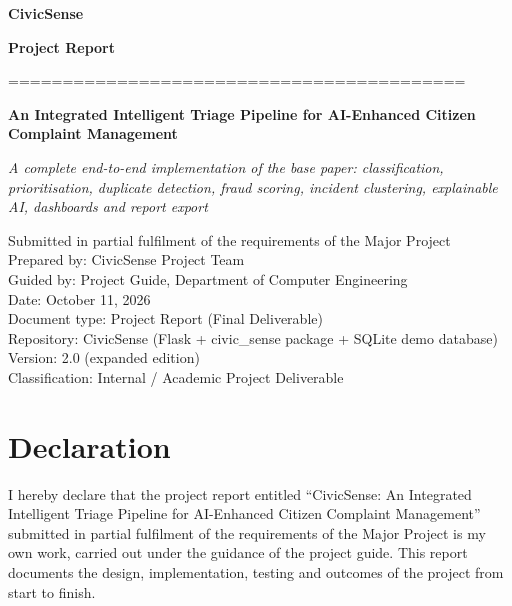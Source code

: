 \documentclass[10pt,letterpaper,oneside]{article}\usepackage{geometry}\geometry{top=1in,bottom=1in,left=1in,right=1in,includeheadfoot}\usepackage{xcolor}\definecolor{color@navy}{HTML}{1F3B63}\definecolor{color@grey}{HTML}{404040}\definecolor{color@hdr}{HTML}{F2F4F7}\usepackage{titlesec}\titleformat{\section}  {\normalfont\huge\bfseries\color@navy}  {}{0pt}{\MakeUppercase}\titleformat{\subsection}  {\normalfont\Large\bfseries\color@navy}  {}{0pt}{}\titleformat{\subsubsection}  {\normalfont\large\bfseries\color@navy}  {}{0pt}{}\titlespacing*{\section}{0pt}{14pt}{6pt}\titlespacing*{\subsection}{0pt}{10pt}{4pt}\titlespacing*{\subsubsection}{0pt}{8pt}{3pt}\setlength{\parindent}{0pt}\setlength{\parskip}{0.6em}\parindent=0pt\usepackage{enumitem}\setlist{nosep,leftmargin=*,itemsep=0pt,topsep=2pt,partopsep=0pt}\usepackage{array}\usepackage{booktabs}\usepackage{caption}\captionsetup{font={small,it},labelfont={bf},labelsep=period,  parskip=2pt,skip=4pt,list=no}\captionsetup[table]{labelfont={bf,small,color@navy},name=Table}\usepackage{graphicx}\usepackage{verbatim}\usepackage{ragged2e}\usepackage{longtable}\usepackage{tabularx}\usepackage{multirow}\usepackage{colortbl}\definecolor{rowshade}{HTML}{F2F4F7}\usepackage{tikz}\usetikzlibrary{positioning,calc}\usepackage[hidelinks]{hyperref}\hypersetup{colorlinks=true,linkcolor=color@navy,urlcolor=color@navy}\pagestyle{fancy}\fancyhf{}\renewcommand{\headrulewidth}{0.4pt}\fancyhead[L]{\small\color@navy CivicSense — Project Report}\fancyhead[R]{\small\color@grey October 11, 2026}\fancyfoot[C]{\small\color@grey An Integrated Intelligent Triage Pipelin}\fancyfoot[R]{\small\color@grey Page \thepage}\usepackage{setspace}\setstretch{1.15}\AtBeginDocument{  \hypersetup{pdftitle={An Integrated Intelligent Triage Pipeline for AI-Enhanced Citizen Complaint Management},    pdfauthor={CivicSense Project Team},    pdfsubject={Project Report},    pdfkeywords={smart cities, NLP, complaint management, e-governance},    pdfcreator={CivicSense Project Team}  }}
\begin{document}
\begin{titlepage}
\centering
\vspace*{3cm}
\begin{center}
\Huge\bfseries{} CivicSense
\end{center}
\vspace{0.6cm}
\begin{center}
\huge\bfseries{} Project Report
\end{center}
\vspace{0.6cm}
\centerline{==========================================}
\vspace{0.4cm}
\begin{center}
\Large\bfseries{} An Integrated Intelligent Triage Pipeline for AI-Enhanced Citizen Complaint Management
\end{center}
\vspace{0.4cm}
\begin{center}
\large\itshape{} A complete end-to-end implementation of the base paper: classification, prioritisation, duplicate detection, fraud scoring, incident clustering, explainable AI, dashboards and report export
\end{center}
\vfill
\begin{center}
\normalsize
Submitted in partial fulfilment of the requirements of the Major Project
\\
Prepared by: CivicSense Project Team
\\
Guided by: Project Guide, Department of Computer Engineering
\\
Date: October 11, 2026
\\
Document type: Project Report (Final Deliverable)
\\
Repository: CivicSense (Flask + civic\_sense package + SQLite demo database)
\\
Version: 2.0 (expanded edition)
\\
Classification: Internal / Academic Project Deliverable
\end{center}
\end{titlepage}
\clearpage
{}
{}
\section*{Declaration}

I hereby declare that the project report entitled “CivicSense: An Integrated Intelligent Triage Pipeline for AI-Enhanced Citizen Complaint Management” submitted in partial fulfilment of the requirements of the Major Project is my own work, carried out under the guidance of the project guide. This report documents the design, implementation, testing and outcomes of the project from start to finish.
\end{document}
